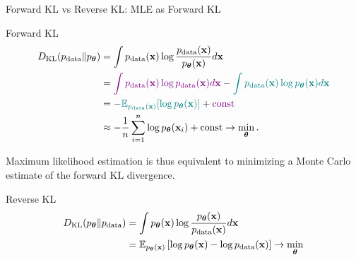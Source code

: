 \documentclass{beamer}
\renewcommand{\eqpause}{}
\renewcommand{\nextonslide}[1]{#1}
\begin{document}
\begin{frame}{Forward KL vs Reverse KL: MLE as Forward KL}
	\begin{block}{Forward KL}
		\vspace{-0.5cm}
		\begin{align*}
			\KL(\pd \| \pt) &= \int \pd(\bx) \log \frac{\pd(\bx)}{\pt(\bx)} d\bx \\
			\nextonslide{&= {\color{violet}\int \pd(\bx) \log \pd(\bx) d \bx} - {\color{teal}\int \pd(\bx) \log \pt(\bx) d \bx}} \\
			\nextonslide{&= -{\color{teal}\bbE_{\pd(\bx)} [\log \pt(\bx)]} + {\color{violet}\text{const}}} \\
			\nextonslide{& \approx - \frac{1}{n} \sum_{i=1}^n \log \pt(\bx_i) + \text{const} \rightarrow \min_{\btheta}.}
		\end{align*}
		\vspace{-0.5cm}
	\end{block}
	\eqpause
	Maximum likelihood estimation is thus equivalent to minimizing a Monte Carlo estimate of the forward KL divergence.
    \eqpause
	\begin{block}{Reverse KL}
		\vspace{-0.5cm}
		\begin{align*}
			\KL(\pt \| \pd) &= \int \pt(\bx) \log \frac{\pt(\bx)}{\pd(\bx)} d \bx \\
			\nextonslide{&= \bbE_{\pt(\bx)} \left[\log \pt(\bx) - \log \pd(\bx)\right] \rightarrow \min_{\btheta}}
		\end{align*}
		\vspace{-0.7cm}
	\end{block}
\end{frame}
\end{document}
